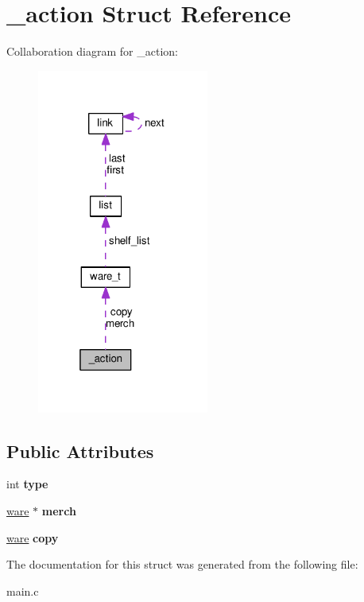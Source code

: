\hypertarget{struct__action}{}\section{\+\_\+action Struct Reference}
\label{struct__action}


Collaboration diagram for \+\_\+action\+:
\nopagebreak
\begin{figure}[H]
\begin{center}
\leavevmode
\includegraphics[width=160pt]{struct__action__coll__graph}
\end{center}
\end{figure}
\subsection*{Public Attributes}
\begin{DoxyCompactItemize}
\item 
int {\bfseries type}\hypertarget{struct__action_a8ba687cc0799b7fdda3f17732064f01b}{}\label{struct__action_a8ba687cc0799b7fdda3f17732064f01b}

\item 
\hyperlink{structware__t}{ware} $\ast$ {\bfseries merch}\hypertarget{struct__action_a7f870b5117a99cd4f9673453dc15fbc2}{}\label{struct__action_a7f870b5117a99cd4f9673453dc15fbc2}

\item 
\hyperlink{structware__t}{ware} {\bfseries copy}\hypertarget{struct__action_a015d51197547226b2711e0d3ba14ad2b}{}\label{struct__action_a015d51197547226b2711e0d3ba14ad2b}

\end{DoxyCompactItemize}


The documentation for this struct was generated from the following file\+:\begin{DoxyCompactItemize}
\item 
main.\+c\end{DoxyCompactItemize}
